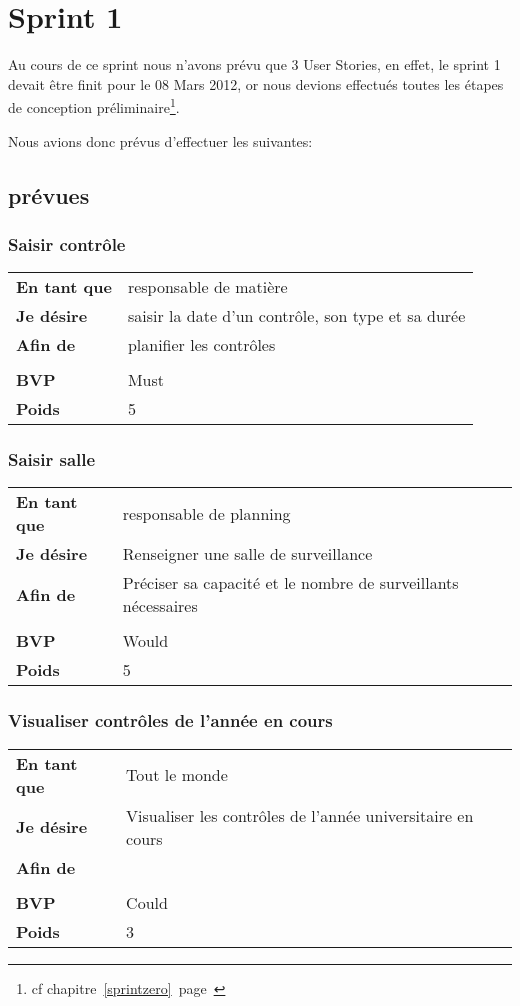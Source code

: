 \chapter{Sprint 1}
Au cours de ce sprint nous n'avons prévu que 3 User Stories, en effet, le sprint 1 devait être 
finit pour le 08 Mars 2012, or nous devions effectués toutes les étapes de conception 
préliminaire\footnote{cf chapitre~\ref{sprintzero}~page~\pageref{sprintzero}}.

Nous avions donc prévus d'effectuer les \USs{} suivantes:
\section{\USs{} prévues}
\subsection{Saisir contrôle}		
\begin{tabular}{ll}
	\textbf{En tant que}	&	responsable de matière\\
	\textbf{Je désire}&	saisir la date d'un contrôle, son type et sa durée\\
	\textbf{Afin de}	&	planifier les contrôles\\
	&\\
	\textbf{BVP} & Must\\
	\textbf{Poids} & 5\\
\end{tabular}
\subsection{Saisir salle}		
\begin{tabular}{ll}
	\textbf{En tant que}	&	responsable de planning\\
	\textbf{Je désire}& Renseigner une salle de surveillance\\	
	\textbf{Afin de}	& Préciser sa capacité et le nombre de surveillants nécessaires\\	
	&\\
	\textbf{BVP} & Would\\
	\textbf{Poids} & 5\\
\end{tabular}
\subsection{Visualiser contrôles de l'année en cours}
\begin{tabular}{ll}
	\textbf{En tant que}	&	Tout le monde\\
	\textbf{Je désire}&	Visualiser les contrôles de l'année universitaire en cours\\
	\textbf{Afin de}	&	\\
	&\\
	\textbf{BVP} & Could\\
	\textbf{Poids} & 3\\
\end{tabular}

